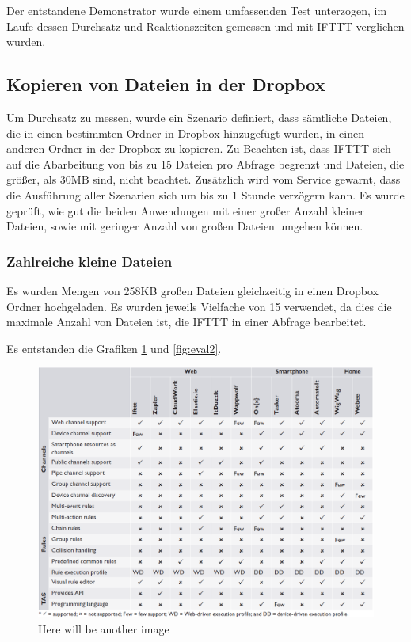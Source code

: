 Der entstandene Demonstrator wurde einem umfassenden Test unterzogen, im Laufe dessen Durchsatz und Reaktionszeiten gemessen und mit IFTTT verglichen wurden. 

\subsection{Kopieren von Dateien in der Dropbox}
Um Durchsatz zu messen, wurde ein Szenario definiert, dass sämtliche Dateien, die in einen bestimmten Ordner in Dropbox hinzugefügt wurden, in einen anderen Ordner in der Dropbox zu kopieren. Zu Beachten ist, dass IFTTT sich auf die Abarbeitung von bis zu 15 Dateien pro Abfrage begrenzt und Dateien, die größer, als 30MB sind, nicht beachtet. Zusätzlich wird vom Service gewarnt, dass die Ausführung aller Szenarien sich um bis zu 1 Stunde verzögern kann.
Es wurde geprüft, wie gut die beiden Anwendungen mit einer großer Anzahl kleiner Dateien, sowie mit geringer Anzahl von großen Dateien umgehen können. 

\subsubsection{Zahlreiche kleine Dateien}
Es wurden Mengen von 258KB großen Dateien gleichzeitig in einen Dropbox Ordner hochgeladen. Es wurden jeweils Vielfache von 15 verwendet, da dies die maximale Anzahl von Dateien ist, die IFTTT in einer Abfrage bearbeitet.

Es entstanden die Grafiken \ref{fig:eval1} und \ref{fig:eval2}.
\begin{figure}
	\centering
	\includegraphics[width=\textwidth]{bilder/TASOverview}
	\caption{Here will be another image}
	\label{fig:eval1}
\end{figure}

